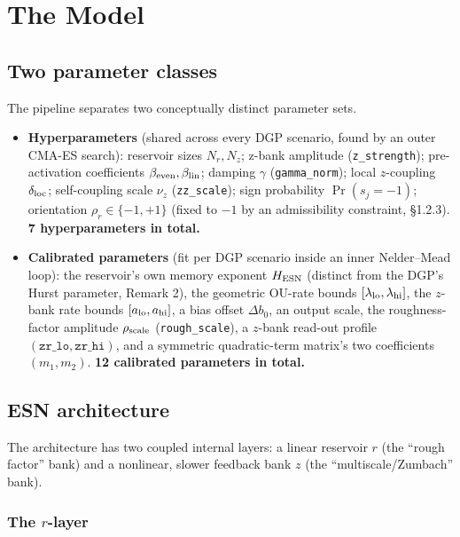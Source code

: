 \documentclass[11pt,a4paper]{article}
\begin{document}
\section{The Model}

\subsection{Two parameter classes}

The pipeline separates two conceptually distinct parameter sets.

\begin{itemize}[itemsep=2pt]
\item \textbf{Hyperparameters} (shared across every DGP scenario,
found by an outer CMA-ES search): reservoir sizes $N_r,N_z$; z-bank
amplitude (\texttt{z\_strength}); pre-activation coefficients
$\beta_{\rm even},\beta_{\rm lin}$; damping $\gamma$
(\texttt{gamma\_norm}); local $z$-coupling $\delta_{\rm loc}$;
self-coupling scale $\nu_z$ (\texttt{zz\_scale}); sign probability
$\Pr(s_j=-1)$; orientation $\rho_r\in\{-1,+1\}$ (fixed to $-1$ by an
admissibility constraint, \S1.2.3). \textbf{7 hyperparameters in
total.}
\item \textbf{Calibrated parameters} (fit per DGP scenario inside an
inner Nelder--Mead loop): the reservoir's own memory exponent
$H_{\rm ESN}$ (distinct from the DGP's Hurst parameter, Remark 2), the
geometric OU-rate bounds $[\lambda_{\rm lo},\lambda_{\rm hi}]$, the
$z$-bank rate bounds $[a_{\rm lo},a_{\rm hi}]$, a bias offset
$\Delta b_0$, an output scale, the roughness-factor amplitude
$\rho_{\rm scale}$ (\texttt{rough\_scale}), a $z$-bank read-out profile
$(\texttt{zr\_lo},\texttt{zr\_hi})$, and a symmetric quadratic-term
matrix's two coefficients $(m_1,m_2)$. \textbf{12 calibrated
parameters in total.}
\end{itemize}

\subsection{ESN architecture}

The architecture has two coupled internal layers: a linear reservoir
$r$ (the ``rough factor'' bank) and a nonlinear, slower feedback bank
$z$ (the ``multiscale/Zumbach'' bank).

\subsubsection{The $r$-layer}
\end{document}
